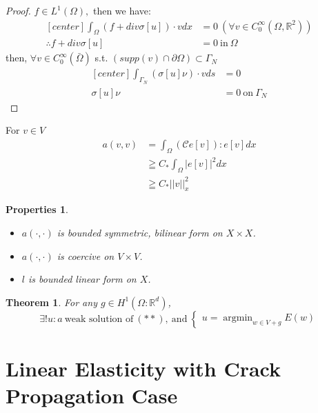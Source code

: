 \documentclass[a4paper,11pt]{article}
\newtheorem{prop}{Properties}
\newtheorem{theorem}{Theorem}
\newcommand{\R}{\mathbb{R}}
\newcommand{\Cmod}{\mathcal{C}}
\DeclareMathOperator*{\argmin}{argmin}
\begin{document}
\begin{proof}
	$f \in L^1(\Omega),$ then we have:
	\begin{equation*}
	\begin{aligned}[center]
	\int_\Omega (f + div \sigma[u]) \cdot v dx &= 0\ (\forall v \in C_0^\infty(\Omega,\R^2))\\
	\therefore f + div \sigma[u] &= 0\ \text{in}\ \Omega
	\end{aligned}
	\end{equation*}
	then, $\forall v \in C_0^\infty (\bar{\Omega})$ s.t. $(supp(v) \cap \partial\Omega) \subset \Gamma_N$
	\begin{equation*}
	\begin{aligned}[center]
	\int_{\Gamma_N} (\sigma[u]\nu)\cdot v ds &= 0\\
	\sigma[u]\nu &= 0\ \text{on}\ \Gamma_N
	\end{aligned}
	\end{equation*}
\end{proof}
For $v \in V$
\begin{equation*}
\begin{aligned}
a(v,v) &= \int_\Omega (\Cmod e[v]) : e[v] dx\\
&\geqq C_* \int_\Omega |e[v]|^2 dx\\
&\geqq C_* ||v||^2_x
\end{aligned}
\end{equation*}
\begin{prop}
	\begin{itemize}
		\item $a(\cdot,\cdot)$ is bounded symmetric, bilinear form on $X \times X$.
		\item $a(\cdot,\cdot)$ is coercive on $V \times V$.
		\item $l$ is bounded linear form on $X$.
	\end{itemize}
\end{prop}
\begin{theorem}
	For any $g\in H^1(\Omega : \R^d)$,
	\begin{equation*}
	\exists! u:a\ \text{weak solution of}\ (**),\ \text{and}\ \begin{cases}
	u=\argmin_{w\in V+g}E(w)
	\end{cases}
	\end{equation*}
\end{theorem}

\iftrue
\section{Linear Elasticity with Crack Propagation Case}
\end{document}
